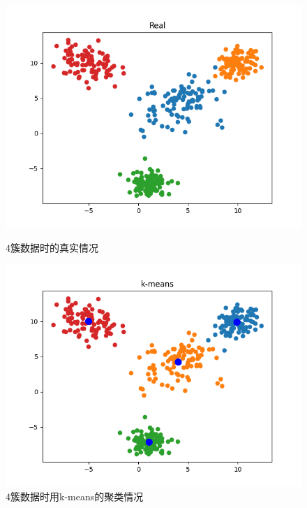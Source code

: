 \begin{figure}[htbp]
    \begin{minipage}[t]{0.3\linewidth}
        \centering
        \includegraphics[width=\textwidth]{figures/Figure_11.png}
        \caption{$4$簇数据时的真实情况}
    \end{minipage}
    \begin{minipage}[t]{0.3\linewidth}
        \centering
        \includegraphics[width=\textwidth]{figures/Figure_12.png}
        \caption{$4$簇数据时用k-means的聚类情况}
    \end{minipage}
    \begin{minipage}[t]{0.3\linewidth}
        \centering

\end{minipage}
\end{figure}
